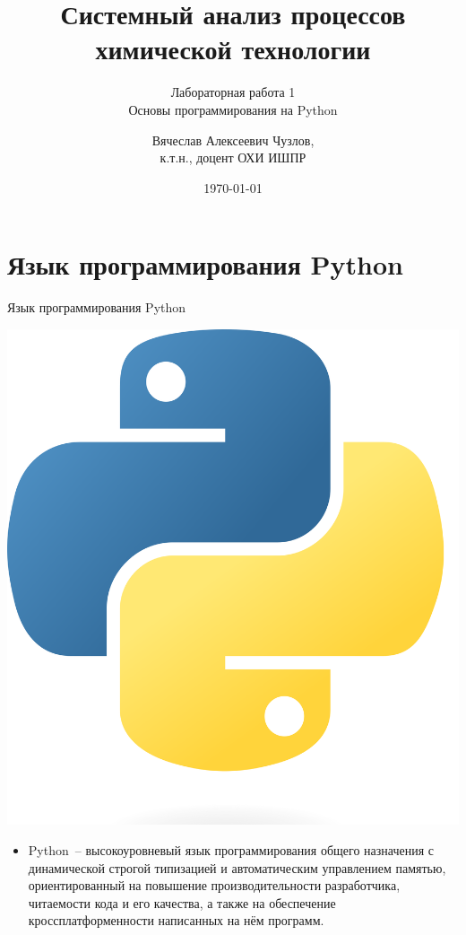 \documentclass[aspectratio=169, mathserif]{beamer}	%
\title{\LARGE{Системный анализ процессов химической технологии}}
\subtitle{Лабораторная работа 1 \\ Основы программирования на Python}
\author[]{Вячеслав Алексеевич Чузлов, \\
	к.т.н., доцент ОХИ ИШПР}
\date{\today}
\begin{document}

\titleframe		%

\tocframe{}		%



\section{Язык программирования Python}
\sectionframe


\begin{frame}[fragile]{Язык программирования Python}
\scriptsize
\begin{minipage}{.1\textwidth}
	\includegraphics[width=\linewidth]{./pics/Python-logo}
\end{minipage}
\begin{minipage}{.89\textwidth}
\begin{itemize}
	\item Python~-- высокоуровневый язык программирования общего назначения с динамической строгой типизацией и автоматическим управлением памятью, ориентированный на повышение производительности разработчика, читаемости кода и его качества, а также на обеспечение кроссплатформенности написанных на нём программ.
\end{itemize}
\end{minipage}


\end{frame}
\end{document}

